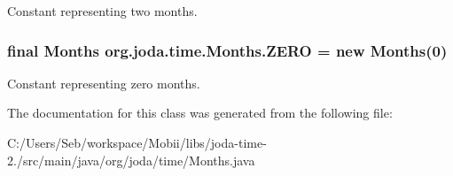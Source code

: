 Constant representing two months. \hypertarget{classorg_1_1joda_1_1time_1_1_months_a1fcee002122b7e638f7423de00c0143c}{
\subsubsection[{Z\-E\-R\-O}]{\setlength{\rightskip}{0pt plus 5cm}final {\bf Months} org.\-joda.\-time.\-Months.\-Z\-E\-R\-O = new {\bf Months}(0)\hspace{0.3cm}{\ttfamily [static]}}}\label{classorg_1_1joda_1_1time_1_1_months_a1fcee002122b7e638f7423de00c0143c}
Constant representing zero months. 

The documentation for this class was generated from the following file\-:\begin{DoxyCompactItemize}
\item 
C\-:/\-Users/\-Seb/workspace/\-Mobii/libs/joda-\/time-\/2./src/main/java/org/joda/time/Months.\-java\end{DoxyCompactItemize}
